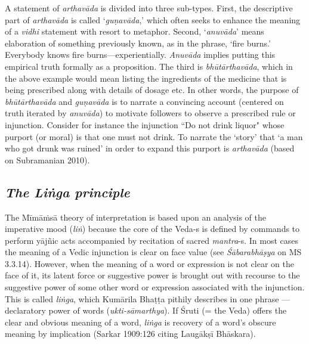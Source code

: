 A statement of \textit{arthavāda} is divided into three sub-types. First, the descriptive part of \textit{arthavāda} is called ‘\textit{guṇavāda},’ which often seeks to enhance the meaning of a \textit{vidhi }statement with resort to metaphor. Second, ‘\textit{anuvāda}’ means elaboration of something previously known, as in the phrase, ‘fire burns.’ Everybody knows fire burns—experientially. \textit{Anuvāda} implies putting this empirical truth formally as a proposition. The third is \textit{bhūtārthavāda}, which in the above example would mean listing the ingredients of the medicine that is being prescribed along with details of dosage etc. In other words, the purpose of \textit{bhūtārthavāda} and \textit{guṇavāda }is to narrate a convincing account (centered on truth iterated by \textit{anuvāda}) to motivate followers to observe a prescribed rule or injunction. Consider for instance the injunction ``Do not drink liquor" whose purport (or moral) is that one must not drink. To narrate the ‘story’ that ‘a man who got drunk was ruined’ in order to expand this purport is \textit{arthavāda} (based on Subramanian 2010).


\subsection*{\textit{The Liṅga principle}}

The Mīmāṁsā theory of interpretation is based upon an analysis of the imperative mood (\textit{liṅ}) because the core of the Veda-s is defined by commands to perform yājñic acts accompanied by recitation of sacred \textit{mantra}-s. In most cases the meaning of a Vedic injunction is clear on face value (see \textit{Śābarabhāṣya} on MS 3.3.14). However, when the meaning of a word or expression is not clear on the face of it, its latent force or suggestive power is brought out with recourse to the suggestive power of some other word or expression associated with the injunction. This is called \textit{liṅga}, which Kumārila Bhaṭṭa pithily describes in one phrase — declaratory power of words (\textit{ukti-sāmarthya}). If Śruti (= the Veda) offers the clear and obvious meaning of a word, \textit{liṅga} is recovery of a word’s obscure meaning by implication (Sarkar 1909:126 citing Laugākṣī Bhāskara).

